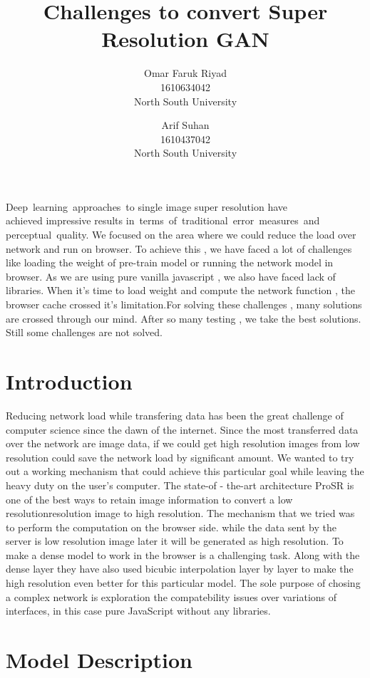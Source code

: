 \documentclass[a4paper,12pt]{article}
\title
{
	Challenges to convert Super Resolution GAN
}
\author
{
	Omar Faruk Riyad  \\
	1610634042 \\ 
	North South University  \\
	\and 
	Arif Suhan \\
	1610437042 \\
	North South University  \\
}
\providecommand{\keywords}[1]{\textbf{\textit{Keywords:}} #1}
\begin{document}
\maketitle

\abstract
{
	Deep learning approaches to single image super resolution have \\
	achieved impressive results in terms of traditional error measures and \\
	perceptual quality. We focused on the area where we could reduce the load over network and run on browser. To achieve this , we have faced a lot of challenges like loading the weight of pre-train model or running the network model in browser. As we are using pure vanilla javascript , we also have faced lack of libraries. When it’s time to load weight and compute the network function , the browser cache crossed it’s limitation.For solving these challenges , many solutions are crossed through our mind. After so many testing , we take the best solutions. Still some challenges are not solved.
} 


\section{Introduction}
Reducing network load while transfering data has been the great challenge of computer science since the dawn of the internet. Since the most transferred data over the network are image data, if we could get high resolution images from low resolution could save the network load by significant amount. We wanted to try out a working mechanism that could achieve this particular goal while leaving the heavy duty on the user's computer. The state-of - the-art architecture ProSR is one of the best ways to retain image information to convert a low resolutionresolution image to high resolution. The mechanism that we tried was to perform the computation on the browser side. while the data sent by the server is low resolution image later it will be generated as high resolution. To make a dense model to work in the browser is a challenging task. Along with the dense layer they have also used bicubic interpolation layer by layer to make the high resolution even better for this particular model. The sole purpose of chosing a complex network is exploration the compatebility issues over variations of interfaces, in this case pure JavaScript without any libraries.

\section{Model Description}
\end{document}
